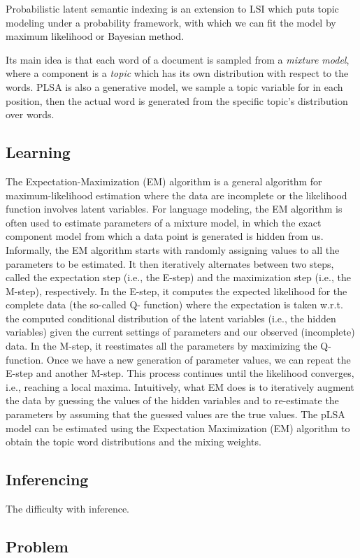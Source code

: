 Probabilistic latent semantic indexing\cite{hofmann1999probabilistic} is an extension to LSI which puts topic modeling under a probability framework, with which we can fit the model by maximum likelihood or Bayesian method.

Its main idea is that each word of a document is sampled from a \emph{mixture model}, where a component is a \emph{topic} which has its own distribution with respect to the words. PLSA is also a generative model, we sample a topic variable for in each position, then the actual word is generated from the specific topic's distribution over words. 

\subsection{Learning}
The Expectation-Maximization (EM) algorithm is a general algorithm for maximum-likelihood estimation where the data are incomplete or the likelihood function involves latent variables. For language modeling, the EM algorithm is often used to estimate parameters of a mixture model, in which the exact component model from which a data point is generated is hidden from us. Informally, the EM algorithm starts with randomly assigning values to all the parameters to be estimated. It then iteratively alternates between two steps, called the expectation step (i.e., the E-step) and the maximization step (i.e., the M-step), respectively. In the E-step, it computes the expected likelihood for the complete data (the so-called Q- function) where the expectation is taken w.r.t. the computed conditional distribution of the latent variables (i.e., the hidden variables) given the current settings of parameters and our observed (incomplete) data. In the M-step, it reestimates all the parameters by maximizing the Q-function. Once we have a new generation of parameter values, we can repeat the E-step and another M-step. This process continues until the likelihood converges, i.e., reaching a local maxima. Intuitively, what EM does is to iteratively augment the data by guessing the values of the hidden variables and to re-estimate the parameters by assuming that the guessed values are the true values. \cite{dempster1977maximum}
The pLSA model can be estimated using the Expectation Maximization (EM) algorithm \cite{mei2001note} to obtain the topic word distributions and the mixing weights. 

\subsection{Inferencing}
The difficulty with inference. 

\subsection{Problem}